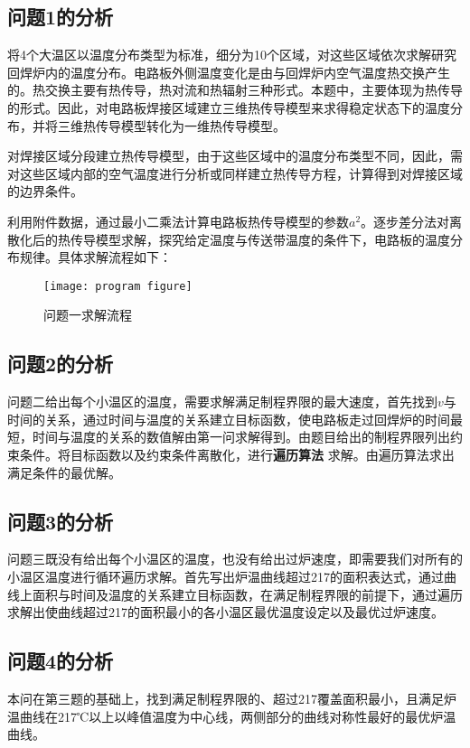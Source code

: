\documentclass[withoutpreface,bwprint]{cumcmthesis} %
\numberwithin{equation}{subsection}
\begin{document}
\subsection{问题1的分析}
将4个大温区以温度分布类型为标准，细分为10个区域，对这些区域依次求解研究回焊炉内的温度分布。电路板外侧温度变化是由与回焊炉内空气温度热交换产生的。热交换主要有热传导，热对流和热辐射三种形式。本题中，主要体现为热传导的形式。因此，对电路板焊接区域建立三维热传导模型来求得稳定状态下的温度分布，并将三维热传导模型转化为一维热传导模型。

对焊接区域分段建立热传导模型，由于这些区域中的温度分布类型不同，因此，需对这些区域内部的空气温度进行分析或同样建立热传导方程，计算得到对焊接区域的边界条件。

利用附件数据，通过最小二乘法计算电路板热传导模型的参数$a^2$。逐步差分法对离散化后的热传导模型求解，探究给定温度与传送带温度的条件下，电路板的温度分布规律。具体求解流程如下：




\begin{figure}[!h]
    \centering
    \texttt{[image: program figure]}
    \caption{问题一求解流程}
    \label{fig:program_figure}
\end{figure}


\subsection{问题2的分析}
问题二给出每个小温区的温度，需要求解满足制程界限的最大速度，首先找到$v$与时间的关系，通过时间与温度的关系建立目标函数，使电路板走过回焊炉的时间最短，时间与温度的关系的数值解由第一问求解得到。由题目给出的制程界限列出约束条件。将目标函数以及约束条件离散化，进行\textbf{遍历算法} 求解。由遍历算法求出满足条件的最优解。

\subsection{问题3的分析}
问题三既没有给出每个小温区的温度，也没有给出过炉速度，即需要我们对所有的小温区温度进行循环遍历求解。首先写出炉温曲线超过217\textcelsius 的面积表达式，通过曲线上面积与时间及温度的关系建立目标函数，在满足制程界限的前提下，通过遍历求解出使曲线超过217\textcelsius 的面积最小的各小温区最优温度设定以及最优过炉速度。

\subsection{问题4的分析}
本问在第三题的基础上，找到满足制程界限的、超过217\textcelsius 覆盖面积最小，且满足炉温曲线在217℃以上以峰值温度为中心线，两侧部分的曲线对称性最好的最优炉温曲线。
\end{document}
